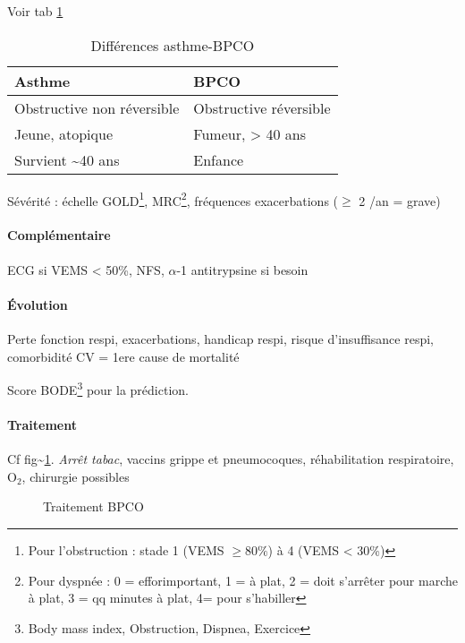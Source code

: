 \documentclass{book}
\begin{document}
Voir tab \ref{tab:org6332cde}

\begin{table}[htbp]
\caption{\label{tab:org6332cde}
Différences asthme-BPCO}
\centering
\begin{tabular}{ll}
\toprule
Asthme & BPCO\\
\midrule
Obstructive non réversible & Obstructive réversible\\
Jeune, atopique & Fumeur, > 40 ans\\
Survient \textasciitilde{}40 ans & Enfance\\
\bottomrule
\end{tabular}
\end{table}

Sévérité : échelle GOLD\footnote{Pour l'obstruction : stade 1 (VEMS \(\ge 80\%\)) à 4 (VEMS < 30\%)}, MRC\footnote{Pour dyspnée : 0 = efforimportant, 1 = à plat, 2 = doit s'arrêter pour
marche à plat, 3 = qq minutes à plat, 4= pour s'habiller}, fréquences exacerbations (\(\ge\) 2 /an = grave)

\paragraph{Complémentaire}
\label{sec:orgde4fe67}
ECG si VEMS < 50\%, NFS, \(\alpha\)-1 antitrypsine si besoin
\paragraph{Évolution}
\label{sec:org91e3fae}
Perte fonction respi, exacerbations, handicap respi, risque
d'insuffisance respi, comorbidité CV = 1ere cause de mortalité

Score BODE\footnote{Body mass index, Obstruction, Dispnea, Exercice} pour la prédiction.
\paragraph{Traitement}
\label{sec:orgac3c8bd}
Cf fig\textasciitilde{}\ref{fig:ttt_bpco}. 
\emph{Arrêt tabac}, vaccins grippe et pneumocoques, réhabilitation respiratoire, O\(_{\text{2}}\), chirurgie possibles
\begin{figure}[htpb]
  \centering
  \caption{Traitement BPCO}
  \label{fig:ttt_bpco}
\end{figure}
\end{document}
